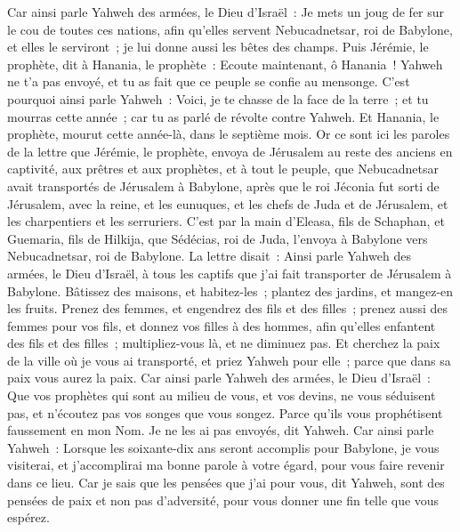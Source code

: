 \begin{multicols}{2}
Car ainsi parle Yahweh des armées, le Dieu d'Israël~: Je mets un joug de fer sur le cou de toutes ces nations, afin qu'elles servent Nebucadnetsar, roi de Babylone, et elles le serviront~; je lui donne aussi les bêtes des champs.
Puis Jérémie, le prophète, dit à Hanania, le prophète~: Ecoute maintenant, ô Hanania~! Yahweh ne t'a pas envoyé, et tu as fait que ce peuple se confie au mensonge.
C'est pourquoi ainsi parle Yahweh~: Voici, je te chasse de la face de la terre~; et tu mourras cette année~; car tu as parlé de révolte contre Yahweh.
Et Hanania, le prophète, mourut cette année-là, dans le septième mois.
\VerseOne{}Or ce sont ici les paroles de la lettre que Jérémie, le prophète, envoya de Jérusalem au reste des anciens en captivité, aux prêtres et aux prophètes, et à tout le peuple, que Nebucadnetsar avait transportés de Jérusalem à Babylone,
après que le roi Jéconia fut sorti de Jérusalem, avec la reine, et les eunuques, et les chefs de Juda et de Jérusalem, et les charpentiers et les serruriers.
C'est par la main d'Eleasa, fils de Schaphan, et Guemaria, fils de Hilkija, que Sédécias, roi de Juda, l'envoya à Babylone vers Nebucadnetsar, roi de Babylone. La lettre disait~:
Ainsi parle Yahweh des armées, le Dieu d'Israël, à tous les captifs que j'ai fait transporter de Jérusalem à Babylone.
Bâtissez des maisons, et habitez-les~; plantez des jardins, et mangez-en les fruits.
Prenez des femmes, et engendrez des fils et des filles~; prenez aussi des femmes pour vos fils, et donnez vos filles à des hommes, afin qu'elles enfantent des fils et des filles~; multipliez-vous là, et ne diminuez pas.
Et cherchez la paix de la ville où je vous ai transporté, et priez Yahweh pour elle~; parce que dans sa paix vous aurez la paix.
Car ainsi parle Yahweh des armées, le Dieu d'Israël~: Que vos prophètes qui sont au milieu de vous, et vos devins, ne vous séduisent pas, et n'écoutez pas vos songes que vous songez.
Parce qu'ils vous prophétisent faussement en mon Nom. Je ne les ai pas envoyés, dit Yahweh.
Car ainsi parle Yahweh~: Lorsque les soixante-dix ans seront accomplis pour Babylone, je vous visiterai, et j'accomplirai ma bonne parole à votre égard, pour vous faire revenir dans ce lieu.
Car je sais que les pensées que j'ai pour vous, dit Yahweh, sont des pensées de paix et non pas d'adversité, pour vous donner une fin telle que vous espérez.

\end{multicols}

